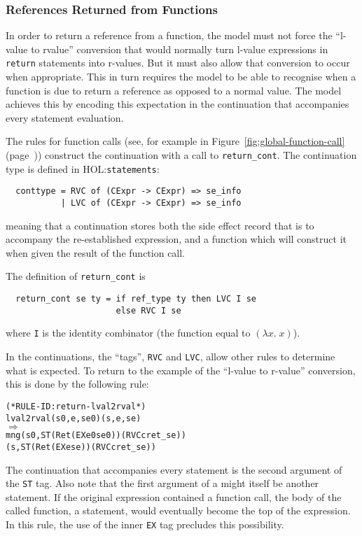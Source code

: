 \documentclass[11pt]{article}
\newcommand{\HOLfile}[1]{HOL:\texttt{#1}}
\begin{document}
\subsubsection{References Returned from Functions}
\label{sec:refs-returned-from-fns}

In order to return a reference from a function, the model must not
force the ``l-value to rvalue'' conversion that would normally turn
l-value expressions in \texttt{return} statements into r-values.  But
it must also allow that conversion to occur when appropriate.  This in
turn requires the model to be able to recognise when a function is due
to return a reference as opposed to a normal value.  The model
achieves this by encoding this expectation in the continuation that
accompanies every statement evaluation.

%
The rules for function calls (see, for example
 in Figure~\ref{fig:global-function-call}
(page~\pageref{fig:global-function-call})) construct the continuation
with a call to \texttt{return_cont}.  The continuation type is defined
in \HOLfile{statements}:
\begin{verbatim}
  conttype = RVC of (CExpr -> CExpr) => se_info
           | LVC of (CExpr -> CExpr) => se_info
\end{verbatim}
meaning that a continuation stores both the side effect record that is
to accompany the re-established expression, and a function which will
construct it when given the result of the function call.

The definition of \texttt{return_cont} is
\begin{verbatim}
  return_cont se ty = if ref_type ty then LVC I se
                      else RVC I se
\end{verbatim}
where \texttt{I} is the identity combinator (the function equal to
$(\lambda x.\;x)$).

In the continuations, the ``tags'', \texttt{RVC} and \texttt{LVC},
allow other rules to determine what is expected.  To return to the
example of the ``l-value to r-value'' conversion, this is done by the
following rule:
\begin{center}
\begin{minipage}{\textwidth}
%
%
\begin{alltt}
(* RULE-ID: return-lval2rval *)
     lval2rval (s0,e,se0) (s,e,se)
   \(\Rightarrow\)
     mng (s0, ST (Ret (EX e0 se0)) (RVC c ret_se))
         (s, ST (Ret (EX e se)) (RVC c ret_se))
\end{alltt}
\end{minipage}
\end{center}
The continuation that accompanies every statement is the second
argument of the \texttt{ST} tag. Also note that the first argument of
a  might itself be another statement.  If the original
expression contained a function call, the body of the called function,
a statement, would eventually become the top of the expression.  In
this rule, the use of the inner \texttt{EX} tag precludes this
possibility.
\end{document}
